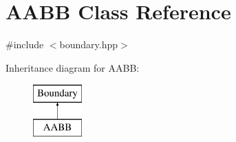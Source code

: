 \hypertarget{class_a_a_b_b}{}\section{A\+A\+BB Class Reference}
\label{class_a_a_b_b}


{\ttfamily \#include $<$boundary.\+hpp$>$}

Inheritance diagram for A\+A\+BB\+:\begin{figure}[H]
\begin{center}
\leavevmode
\includegraphics[height=2.000000cm]{class_a_a_b_b}
\end{center}
\end{figure}
